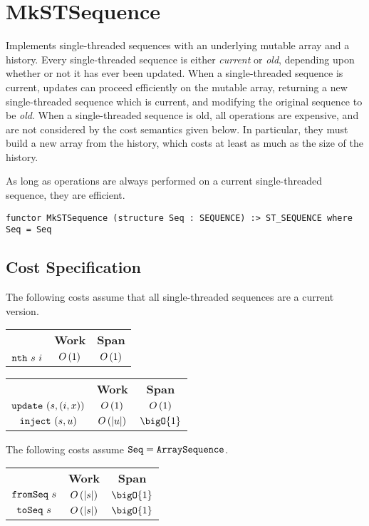 \chapter{MkSTSequence}
\label{ch:st-seq}
\begin{preamble}
Implements single-threaded sequences with an underlying mutable array and a
history.
Every single-threaded sequence is either \emph{current} or \emph{old},
depending upon whether or not it has ever been updated.
When a single-threaded sequence is current, updates can proceed efficiently
on the mutable array, returning a new single-threaded sequence which is
current, and modifying the original sequence to be \emph{old}.
When a single-threaded sequence is old, all operations are expensive, and
are not considered by the cost semantics given below. In particular, they
must build a new array from the history, which costs at least as much as the
size of the history.

As long as operations are always performed on a current
single-threaded sequence, they are efficient.
\begin{verbatim}
functor MkSTSequence (structure Seq : SEQUENCE) :> ST_SEQUENCE where Seq = Seq
\end{verbatim}
\end{preamble}

\section{Cost Specification}

\begin{gram}
The following costs assume that all single-threaded sequences are a current
version.
\end{gram}

\begin{costspec}[Indexing]
\begin{tabular}{ccc}
& \textbf{Work} & \textbf{Span} \\
$\texttt{nth}~s~i$ & $O\left({1}\right)$ & $O\left({1}\right)$
\end{tabular}
\end{costspec}

\begin{costspec}[Updates]
\begin{tabular}{ccc}
& \textbf{Work} & \textbf{Span} \\
$\texttt{update}~(s,(i,x))$ & $O\left({1}\right)$ & $O\left({1}\right)$ \\
$\texttt{inject}~(s,u)$ & $O\left({|u|}\right)$ & $\bigO{1}$
\end{tabular}
\end{costspec}

\begin{costspec}[Conversion]
The following costs assume $\texttt{Seq} = \texttt{ArraySequence}$.
\begin{tabular}{ccc}
& \textbf{Work} & \textbf{Span} \\
$\texttt{fromSeq}~s$ & $O\left({|s|}\right)$ & $\bigO{1}$ \\
$\texttt{toSeq}~s$ & $O\left({|s|}\right)$ & $\bigO{1}$
\end{tabular}
\end{costspec}

